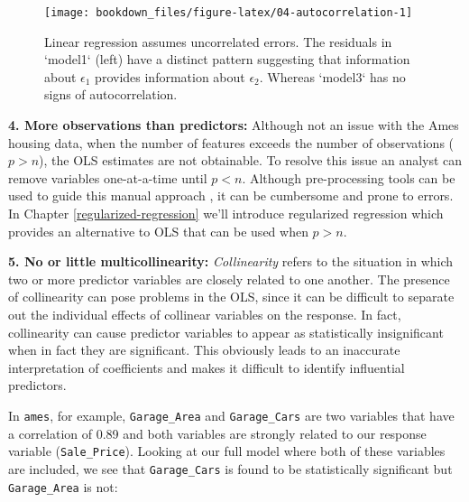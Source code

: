\documentclass[]{krantz}
\makeatletter
\newenvironment{Shaded}{\begin{snugshade}}{\end{snugshade}}
\newcommand{\CommentTok}[1]{\textcolor[rgb]{0.37,0.37,0.37}{\textit{#1}}}
\newcommand{\KeywordTok}[1]{\textcolor[rgb]{0.27,0.27,0.27}{\textbf{#1}}}
\newcommand{\NormalTok}[1]{#1}
\newcommand{\OperatorTok}[1]{\textcolor[rgb]{0.43,0.43,0.43}{\textbf{#1}}}
\newcommand{\StringTok}[1]{\textcolor[rgb]{0.5,0.5,0.5}{#1}}
\newenvironment{kframe}{%
\medskip{}
\setlength{\fboxsep}{.8em}
 \def\at@end@of@kframe{}%
 \ifinner\ifhmode%
  \def\at@end@of@kframe{\end{minipage}}%
  \begin{minipage}{\columnwidth}%
 \fi\fi%
 \def\FrameCommand##1{\hskip\@totalleftmargin \hskip-\fboxsep
 \colorbox{shadecolor}{##1}\hskip-\fboxsep
     \hskip-\linewidth \hskip-\@totalleftmargin \hskip\columnwidth}%
 \MakeFramed {\advance\hsize-\width
   \@totalleftmargin\z@ \linewidth\hsize
   \@setminipage}}%
 {\par\unskip\endMakeFramed%
 \at@end@of@kframe}
\renewenvironment{Shaded}{\begin{kframe}}{\end{kframe}}
\makeatother
\begin{document}
\begin{figure}

{\centering \texttt{[image: bookdown\_files/figure-latex/04-autocorrelation-1]} 

}

\caption{Linear regression assumes uncorrelated errors. The residuals in `model1` (left) have a distinct pattern suggesting that information about $\epsilon_1$ provides information about $\epsilon_2$. Whereas `model3` has no signs of autocorrelation.}\label{fig:04-autocorrelation}
\end{figure}

\textbf{4. More observations than predictors:} Although not an issue with the Ames housing data, when the number of features exceeds the number of observations (\(p > n\)), the OLS estimates are not obtainable. To resolve this issue an analyst can remove variables one-at-a-time until \(p < n\). Although pre-processing tools can be used to guide this manual approach \citep[43-47]{apm}, it can be cumbersome and prone to errors. In Chapter \ref{regularized-regression} we'll introduce regularized regression which provides an alternative to OLS that can be used when \(p > n\).

\textbf{5. No or little multicollinearity:} \emph{Collinearity} refers to the situation in which two or more predictor variables are closely related to one another. The presence of collinearity can pose problems in the OLS, since it can be difficult to separate out the individual effects of collinear variables on the response. In fact, collinearity can cause predictor variables to appear as statistically insignificant when in fact they are significant. This obviously leads to an inaccurate interpretation of coefficients and makes it difficult to identify influential predictors.

In \texttt{ames}, for example, \texttt{Garage\_Area} and \texttt{Garage\_Cars} are two variables that have a correlation of 0.89 and both variables are strongly related to our response variable (\texttt{Sale\_Price}). Looking at our full model where both of these variables are included, we see that \texttt{Garage\_Cars} is found to be statistically significant but \texttt{Garage\_Area} is not:

\begin{Shaded}
\end{Shaded}
\end{document}
